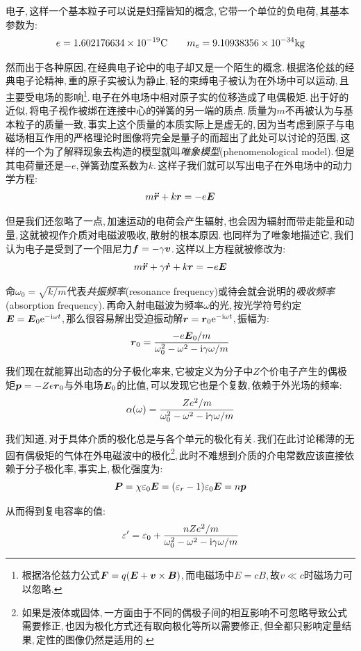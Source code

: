 电子,\,这样一个基本粒子可以说是妇孺皆知的概念,\,它带一个单位的负电荷,\,其基本参数为:
\[e=1.602176634\times 10^{-19}{\rm C}\qquad m_e=9.10938356\times 10^{-34}{\rm kg}\]

然而出于各种原因,\,在经典电子论中的电子却又是一个陌生的概念.\,根据洛伦兹的经典电子论精神,\,重的原子实被认为静止,\,轻的束缚电子被认为在外场中可以运动,\,且主要受电场的影响\footnote{根据洛伦兹力公式$\boldsymbol{F}=q(\boldsymbol{E}+\boldsymbol{v}\times\boldsymbol{B})$,\,而电磁场中$E=cB$,\,故$v\ll c$时磁场力可以忽略.}.\,电子在外电场中相对原子实的位移造成了电偶极矩.\,出于好的近似,\,将电子视作被绑在连接中心的弹簧的另一端的质点.\,质量为$m$不再被认为与基本粒子的质量一致,\,事实上这个质量的本质实际上是虚无的,\,因为当考虑到原子与电磁场相互作用的严格理论时图像将完全是量子的而超出了此处可以讨论的范围,\,这样的一个为了解释现象去构造的模型就叫\emph{唯象模型}(phenomenological model).\,但是其电荷量还是$-e$,\,弹簧劲度系数为$k$.\,这样子我们就可以写出电子在外电场中的动力学方程:
\[m\boldsymbol{\ddot{r}}+k\boldsymbol{r}=-e\boldsymbol{E}\]

但是我们还忽略了一点,\,加速运动的电荷会产生辐射,\,也会因为辐射而带走能量和动量,\,这就被视作介质对电磁波吸收,\,散射的根本原因.\,也同样为了唯象地描述它,\,我们认为电子是受到了一个阻尼力$\boldsymbol{f}=-\gamma \boldsymbol{v}$.\,这样以上方程就被修改为:
\[m\boldsymbol{\ddot{r}}+\gamma \boldsymbol{\dot{r}}+k\boldsymbol{r}=-e\boldsymbol{E}\]

命$\omega_0=\sqrt{k/m}$代表\emph{共振频率}(resonance frequency)或待会就会说明的\emph{吸收频率}(absorption frequency).\,再命入射电磁波为频率$\omega$的光,\,按光学符号约定$\boldsymbol{E}=\boldsymbol{E}_0{\rm e}^{-{\rm i}\omega t}$,\,那么很容易解出受迫振动解$\boldsymbol{r}=\boldsymbol{r}_0{\rm e}^{-{\rm i}\omega t}$,\,振幅为:
\[\boldsymbol{r}_0=\frac{-e\boldsymbol{E}_0/m}{\omega_0^2-\omega^2-{\rm i}\gamma\omega/m}\]

我们现在就能算出动态的分子极化率来,\,它被定义为分子中$Z$个价电子产生的偶极矩$\boldsymbol{p}=-Ze\boldsymbol{r}_0$与外电场$\boldsymbol{E}_0$的比值,\,可以发现它也是个复数,\,依赖于外光场的频率:
\[\alpha(\omega)=\frac{Ze^2/m}{\omega_0^2-\omega^2-{\rm i}\gamma\omega/m}\]

我们知道,\,对于具体介质的极化总是与各个单元的极化有关.\,我们在此讨论稀薄的无固有偶极矩的气体在外电磁波中的极化\footnote{如果是液体或固体,\,一方面由于不同的偶极子间的相互影响不可忽略导致公式需要修正,\,也因为极化方式还有取向极化等所以需要修正,\,但全都只影响定量结果,\,定性的图像仍然是适用的.},\,此时不难想到介质的介电常数应该直接依赖于分子极化率,\,事实上,\,极化强度为:
\[\boldsymbol{P}=\chi\varepsilon_0\boldsymbol{E}=(\varepsilon_r-1)\varepsilon_0\boldsymbol{E}=n\boldsymbol{p}\]


从而得到复电容率的值:
\[\varepsilon'=\varepsilon_0+\frac{nZe^2/m}{\omega_0^2-\omega^2-{\rm i}\gamma\omega/m}\]

